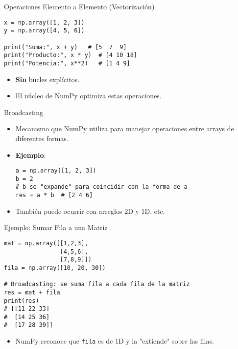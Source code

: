 \documentclass[10pt]{beamer}
\begin{document}
\begin{frame}[fragile]{Operaciones Elemento a Elemento (Vectorización)}
\begin{verbatim}
x = np.array([1, 2, 3])
y = np.array([4, 5, 6])

print("Suma:", x + y)   # [5  7  9]
print("Producto:", x * y)  # [4 10 18]
print("Potencia:", x**2)   # [1 4 9]
\end{verbatim}
\begin{itemize}
  \item \textbf{Sin} bucles explícitos.
  \item El núcleo de NumPy optimiza estas operaciones.
\end{itemize}
\end{frame}

\begin{frame}[fragile]{Broadcasting}
  \begin{itemize}
    \item Mecanismo que NumPy utiliza para manejar operaciones entre arrays de diferentes formas.
    \item \textbf{Ejemplo}:
\begin{verbatim}
a = np.array([1, 2, 3])
b = 2
# b se "expande" para coincidir con la forma de a
res = a * b  # [2 4 6]
\end{verbatim}
    \item También puede ocurrir con arreglos 2D y 1D, etc.
  \end{itemize}
\end{frame}

\begin{frame}[fragile]{Ejemplo: Sumar Fila a una Matriz}
\begin{verbatim}
mat = np.array([[1,2,3],
                [4,5,6],
                [7,8,9]])
fila = np.array([10, 20, 30])

# Broadcasting: se suma fila a cada fila de la matriz
res = mat + fila
print(res)
# [[11 22 33]
#  [14 25 36]
#  [17 28 39]]
\end{verbatim}
\begin{itemize}
  \item NumPy reconoce que \texttt{fila} es de 1D y la "extiende" sobre las filas.
\end{itemize}
\end{frame}
\end{document}
